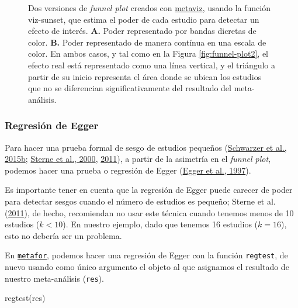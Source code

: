 \documentclass[
  bookmarksnumbered]{article}
\newenvironment{Shaded}{\begin{snugshade}}{\end{snugshade}}
\newcommand{\FunctionTok}[1]{\textcolor[rgb]{0.39,0.29,0.61}{#1}}
\newcommand{\NormalTok}[1]{\textcolor[rgb]{0.12,0.11,0.11}{#1}}
\begin{document}
\begin{figure}
\caption{\label{fig:funnel-plot3}Dos versiones de \emph{funnel plot} creados con \href{https://cran.r-project.org/web/packages/metaviz/vignettes/metaviz.html}{metaviz}, usando la función viz-sunset, que estima el poder de cada estudio para detectar un efecto de interés. \textbf{A.} Poder representado por bandas dicretas de color. \textbf{B.} Poder representado de manera contínua en una escala de color. En ambos casos, y tal como en la Figura \ref{fig:funnel-plot2}, el efecto real está representado como una línea vertical, y el triángulo a partir de su inicio representa el área donde se ubican los estudios que no se diferencian significativamente del resultado del meta-análisis.}
\end{figure}

\hypertarget{reg-egger}{%
\subsubsection{Regresión de Egger}\label{reg-egger}}

Para hacer una prueba formal de sesgo de estudios pequeños (\protect\hyperlink{ref-schwarzerSmallStudyEffectsMetaAnalysis2015}{Schwarzer et al., 2015b}; \protect\hyperlink{ref-sternePublicationRelatedBias2000}{Sterne et al., 2000}, \protect\hyperlink{ref-sterneRecommendationsExaminingInterpreting2011}{2011}), a partir de la asimetría en el \emph{funnel plot}, podemos hacer una prueba o regresión de Egger (\protect\hyperlink{ref-eggerBiasMetaanalysisDetected1997}{Egger et al., 1997}).

Es importante tener en cuenta que la regresión de Egger puede carecer de poder para detectar sesgos cuando el número de estudios es pequeño; Sterne et al. (\protect\hyperlink{ref-sterneRecommendationsExaminingInterpreting2011}{2011}), de hecho, recomiendan no usar este técnica cuando tenemos menos de 10 estudios (\(k < 10\)). En nuestro ejemplo, dado que tenemos 16 estudios (\(k = 16\)), esto no debería ser un problema.

En \href{https://www.metafor-project.org/doku.php}{\texttt{metafor}}, podemos hacer una regresión de Egger con la función \texttt{regtest}, de nuevo usando como único argumento el objeto al que asignamos el resultado de nuestro meta-análisis (\texttt{res}).

\begin{Shaded}
\begin{Highlighting}[]
\FunctionTok{regtest}\NormalTok{(res)}
\end{Highlighting}
\end{Shaded}
\end{document}
